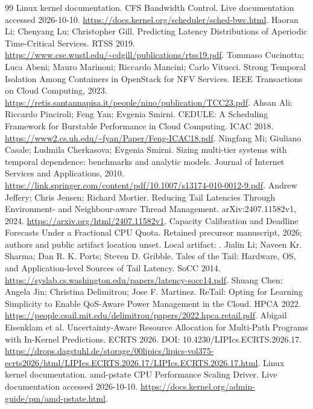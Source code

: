 \documentclass[11pt,a4paper]{article}
\begin{document}
\begin{thebibliography}{99}
 Linux kernel documentation. CFS Bandwidth Control. Live documentation accessed 2026-10-10. \url{https://docs.kernel.org/scheduler/sched-bwc.html}.
 Haoran Li; Chenyang Lu; Christopher Gill. Predicting Latency Distributions of Aperiodic Time-Critical Services. RTSS 2019. \url{https://www.cse.wustl.edu/~cdgill/publications/rtss19.pdf}.
 Tommaso Cucinotta; Luca Abeni; Mauro Marinoni; Riccardo Mancini; Carlo Vitucci. Strong Temporal Isolation Among Containers in OpenStack for NFV Services. IEEE Transactions on Cloud Computing, 2023. \url{https://retis.santannapisa.it/people/nino/publication/TCC23.pdf}.
 Ahsan Ali; Riccardo Pinciroli; Feng Yan; Evgenia Smirni. CEDULE: A Scheduling Framework for Burstable Performance in Cloud Computing. ICAC 2018. \url{https://www2.cs.uh.edu/~fyan/Paper/Feng-ICAC18.pdf}.
 Ningfang Mi; Giuliano Casale; Ludmila Cherkasova; Evgenia Smirni. Sizing multi-tier systems with temporal dependence: benchmarks and analytic models. Journal of Internet Services and Applications, 2010. \url{https://link.springer.com/content/pdf/10.1007/s13174-010-0012-9.pdf}.
 Andrew Jeffery; Chris Jensen; Richard Mortier. Reducing Tail Latencies Through Environment- and Neighbour-aware Thread Management. arXiv:2407.11582v1, 2024. \url{https://arxiv.org/html/2407.11582v1}.
 Capacity Calibration and Deadline Forecasts Under a Fractional CPU Quota. Retained precursor manuscript, 2026; authors and public artifact location unset. Local artifact: .
 Jialin Li; Naveen Kr. Sharma; Dan R. K. Ports; Steven D. Gribble. Tales of the Tail: Hardware, OS, and Application-level Sources of Tail Latency. SoCC 2014. \url{https://syslab.cs.washington.edu/papers/latency-socc14.pdf}.
 Shuang Chen; Angela Jin; Christina Delimitrou; Jose F. Martinez. ReTail: Opting for Learning Simplicity to Enable QoS-Aware Power Management in the Cloud. HPCA 2022. \url{https://people.csail.mit.edu/delimitrou/papers/2022.hpca.retail.pdf}.
 Abigail Eisenklam et al. Uncertainty-Aware Resource Allocation for Multi-Path Programs with In-Kernel Predictions. ECRTS 2026. DOI: 10.4230/LIPIcs.ECRTS.2026.17. \url{https://drops.dagstuhl.de/storage/00lipics/lipics-vol375-ecrts2026/html/LIPIcs.ECRTS.2026.17/LIPIcs.ECRTS.2026.17.html}.
 Linux kernel documentation. amd-pstate CPU Performance Scaling Driver. Live documentation accessed 2026-10-10. \url{https://docs.kernel.org/admin-guide/pm/amd-pstate.html}.
\end{thebibliography}
\end{document}
